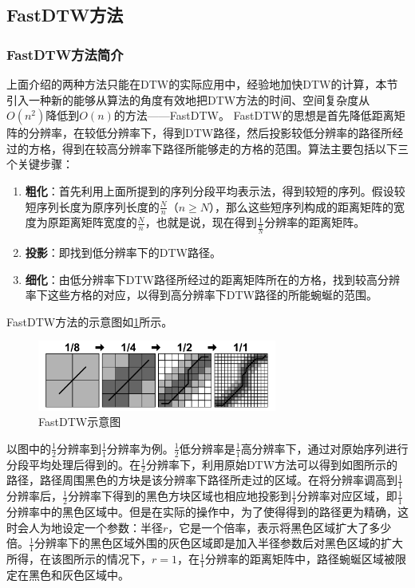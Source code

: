 \subsection{FastDTW方法}
\subsubsection{FastDTW方法简介}
上面介绍的两种方法只能在DTW的实际应用中，经验地加快DTW的计算，本节引入一种新的能够从算法的角度有效地把DTW方法的时间、空间复杂度从$O(n^2)$降低到$O(n)$的方法——FastDTW\cite{Salvador2007}。
FastDTW的思想是首先降低距离矩阵的分辨率，在较低分辨率下，得到DTW路径，然后投影较低分辨率的路径所经过的方格，得到在较高分辨率下路径所能够走的方格的范围。算法主要包括以下三个关键步骤：
\begin{enumerate}
  \item \textbf{粗化}：首先利用上面所提到的序列分段平均表示法，得到较短的序列。假设较短序列长度为原序列长度的$\frac{N}{n}$（$n \ge N$），那么这些短序列构成的距离矩阵的宽度为原距离矩阵宽度的$\frac{N}{n}$，也就是说，现在得到$\frac{1}{\frac{n}{N}}$分辨率的距离矩阵。
  \item \textbf{投影}：即找到低分辨率下的DTW路径。
  \item \textbf{细化}：由低分辨率下DTW路径所经过的距离矩阵所在的方格，找到较高分辨率下这些方格的对应，以得到高分辨率下DTW路径的所能蜿蜒的范围。
\end{enumerate}
FastDTW方法的示意图如\ref{fig:10}所示。
\begin{figure}[h]
  \centering
  \includegraphics[width=0.7\textwidth]{./figure/FastDTW.PNG}
  \caption{FastDTW示意图}\label{fig:10}
\end{figure}

以图中的$\frac{1}{2}$分辨率到$\frac{1}{1}$分辨率为例。$\frac{1}{2}$低分辨率是$\frac{1}{1}$高分辨率下，通过对原始序列进行分段平均处理后得到的。在$\frac{1}{2}$分辨率下，利用原始DTW方法可以得到如图所示的路径，路径周围黑色的方块是该分辨率下路径所走过的区域。在将分辨率调高到$\frac{1}{1}$分辨率后，$\frac{1}{2}$分辨率下得到的黑色方块区域也相应地投影到$\frac{1}{1}$分辨率对应区域，即$\frac{1}{1}$分辨率中的黑色区域中。但是在实际的操作中，为了使得得到的路径更为精确，这时会人为地设定一个参数：半径$r$，它是一个倍率，表示将黑色区域扩大了多少倍。$\frac{1}{1}$分辨率下的黑色区域外围的灰色区域即是加入半径参数后对黑色区域的扩大所得，在该图所示的情况下，$r=1$，在$\frac{1}{1}$分辨率的距离矩阵中，路径蜿蜒区域被限定在黑色和灰色区域中。

